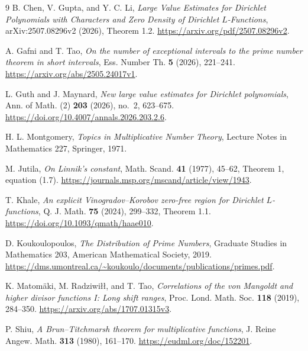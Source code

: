 \documentclass[11pt]{article}
\theoremstyle{remark}
\newcommand{\1}{\mathbf 1}
\begin{document}


\begin{thebibliography}{9}
B. Chen, V. Gupta, and Y. C. Li,
\emph{Large Value Estimates for Dirichlet Polynomials with Characters and Zero Density of Dirichlet $L$-Functions},
arXiv:2507.08296v2 (2026), Theorem 1.2.
\url{https://arxiv.org/pdf/2507.08296v2}.

A. Gafni and T. Tao,
\emph{On the number of exceptional intervals to the prime number theorem in
short intervals},
Ess. Number Th. \textbf{5} (2026), 221--241.
\url{https://arxiv.org/abs/2505.24017v1}.

L. Guth and J. Maynard,
\emph{New large value estimates for Dirichlet polynomials},
Ann. of Math. (2) \textbf{203} (2026), no.~2, 623--675.
\url{https://doi.org/10.4007/annals.2026.203.2.6}.

H. L. Montgomery,
\emph{Topics in Multiplicative Number Theory},
Lecture Notes in Mathematics 227, Springer, 1971.

M. Jutila,
\emph{On Linnik's constant},
Math. Scand. \textbf{41} (1977), 45--62, Theorem 1, equation (1.7).
\url{https://journals.msp.org/mscand/article/view/1943}.

T. Khale,
\emph{An explicit Vinogradov--Korobov zero-free region for Dirichlet $L$-functions},
Q. J. Math. \textbf{75} (2024), 299--332, Theorem 1.1.
\url{https://doi.org/10.1093/qmath/haae010}.

D. Koukoulopoulos,
\emph{The Distribution of Prime Numbers},
Graduate Studies in Mathematics 203, American Mathematical Society, 2019.
\url{https://dms.umontreal.ca/~koukoulo/documents/publications/primes.pdf}.

K. Matom\"aki, M. Radziwi\l\l, and T. Tao,
\emph{Correlations of the von Mangoldt and higher divisor functions I: Long shift ranges},
Proc. Lond. Math. Soc. \textbf{118} (2019), 284--350.
\url{https://arxiv.org/abs/1707.01315v3}.

P. Shiu,
\emph{A Brun--Titchmarsh theorem for multiplicative functions},
J. Reine Angew. Math. \textbf{313} (1980), 161--170.
\url{https://eudml.org/doc/152201}.
\end{thebibliography}
\end{document}
